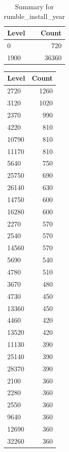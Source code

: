 \begin{table}[ht]
\centering
\begin{tabular}{lr}
  \hline
Level & Count \\ 
  \hline
0 & 720 \\ 
  1900 & 36360 \\ 
   \hline
\end{tabular}
\caption{Summary for rumble_install_year} 
\label{tab: rumble_install_year}
\end{table}
\begin{table}[ht]
\centering
\begin{tabular}{lr}
  \hline
Level & Count \\ 
  \hline
2720 & 1260 \\ 
  3120 & 1020 \\ 
  2370 & 990 \\ 
  4220 & 810 \\ 
  10790 & 810 \\ 
  11170 & 810 \\ 
  5640 & 750 \\ 
  25750 & 690 \\ 
  26140 & 630 \\ 
  14750 & 600 \\ 
  16280 & 600 \\ 
  2270 & 570 \\ 
  2540 & 570 \\ 
  14560 & 570 \\ 
  5690 & 540 \\ 
  4780 & 510 \\ 
  3670 & 480 \\ 
  4730 & 450 \\ 
  13360 & 450 \\ 
  4460 & 420 \\ 
  13520 & 420 \\ 
  11130 & 390 \\ 
  25140 & 390 \\ 
  28370 & 390 \\ 
  2100 & 360 \\ 
  2280 & 360 \\ 
  2550 & 360 \\ 
  9640 & 360 \\ 
  12690 & 360 \\ 
  32260 & 360 \\ 

\end{tabular}
\end{table}
